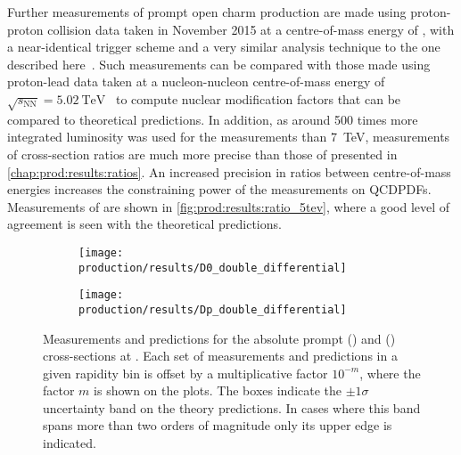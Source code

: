 Further measurements of prompt open charm production are made using
proton-proton collision data taken in November 2015 at a
centre-of-mass energy of , with a near-identical trigger scheme and
a very similar analysis technique to the one described
here~\cite{Aaij:2016jht}.
Such measurements can be compared with those made using proton-lead data taken
at a nucleon-nucleon centre-of-mass energy of $\sqrt{s_{\text{NN}}} =
\SI{5.02}{\TeV}$~\cite{LHCb-CONF-2016-003} to compute nuclear modification
factors that can be compared to theoretical predictions.
In addition, as around 500 times more integrated luminosity was used for the
 measurements than \SI{7}{\TeV}, measurements of cross-section ratios
 are much more precise than those of
  presented in \cref{chap:prod:results:ratios}.
An increased precision in ratios between centre-of-mass energies increases the
constraining power of the measurements on \acp{QCDPDF}.
Measurements of  are shown in
\cref{fig:prod:results:ratio_5tev}, where a good level of agreement is seen with
the theoretical predictions.

\begin{figure}
  \begin{subfigure}[b]{\textwidth}
    \centering
    \texttt{[image: production/results/D0\_double\_differential]}
    \caption{\PDzero}
    \label{fig:prod:results:double_differential:D0}
  \end{subfigure}
  \begin{subfigure}[b]{\textwidth}
    \centering
    \texttt{[image: production/results/Dp\_double\_differential]}
    \caption{\PDplus}
    \label{fig:prod:results:double_differential:Dp}
  \end{subfigure}
  \caption{%
    Measurements and predictions for the absolute prompt \PDzero
    () and \PDplus
    () cross-sections at
    .
    Each set of measurements and predictions in a given rapidity bin is offset
    by a multiplicative factor $10^{-m}$, where the factor $m$ is shown on the
    plots.
    The boxes indicate the $\pm1\sigma$ uncertainty band on the theory
    predictions.
    In cases where this band spans more than two orders of magnitude only its
    upper edge is indicated.
  }
  \label{fig:prod:results:double_differential:D0_Dp}
\end{figure}

